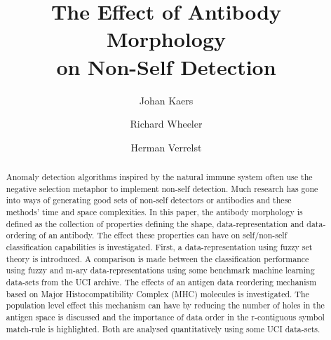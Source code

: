 \documentclass{llncs}
\begin{document}
\title{The Effect of Antibody Morphology \\ on Non-Self Detection}
\author{Johan Kaers\and  Richard Wheeler \and Herman Verrelst}

\maketitle

\begin{abstract}
Anomaly detection algorithms inspired by the natural immune system often use the negative selection metaphor to implement non-self detection.
Much research has gone into ways of generating good sets of non-self detectors or antibodies and these methods' time and space complexities.
In this paper, the antibody morphology is defined as the collection of properties defining the shape, data-representation and data-ordering of an antibody.
The effect these properties can have on self/non-self classification capabilities is investigated.
First, a data-representation using fuzzy set theory is introduced.
A comparison is made between the classification performance using fuzzy and m-ary data-representations using some benchmark machine learning data-sets from the UCI archive.
The effects of an antigen data reordering mechanism based on Major Histocompatibility Complex (MHC) molecules is investigated.
The population level effect this mechanism can have by reducing the number of holes in the antigen space is discussed and the importance of data order in the r-contiguous symbol match-rule is highlighted.
Both are analysed quantitatively using some UCI data-sets.
\end{abstract}

\end{document}
